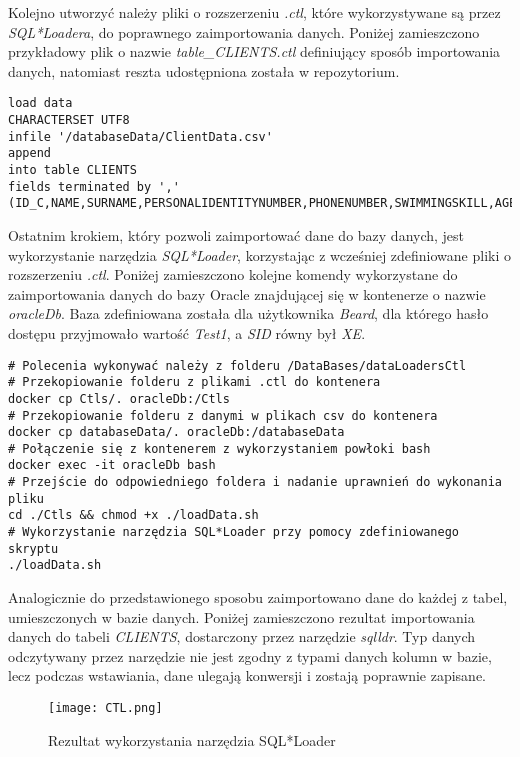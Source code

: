 \documentclass[a4paper]{article}
\begin{document}
Kolejno utworzyć należy pliki o rozszerzeniu \textit{.ctl}, które wykorzystywane są przez \textit{SQL*Loadera}, \linebreak do poprawnego zaimportowania danych. Poniżej zamieszczono przykładowy plik o nazwie \linebreak \textit{table\_CLIENTS.ctl} definiujący sposób importowania danych, natomiast reszta udostępniona została w repozytorium.

\begin{verbatim}
load data 
CHARACTERSET UTF8
infile '/databaseData/ClientData.csv' 
append
into table CLIENTS
fields terminated by ','
(ID_C,NAME,SURNAME,PERSONALIDENTITYNUMBER,PHONENUMBER,SWIMMINGSKILL,AGE)
\end{verbatim}

Ostatnim krokiem, który pozwoli zaimportować dane do bazy danych, jest wykorzystanie narzędzia \textit{SQL*Loader}, korzystając z wcześniej zdefiniowane pliki o rozszerzeniu \textit{.ctl}. Poniżej zamieszczono kolejne komendy wykorzystane do zaimportowania danych do bazy Oracle znajdującej się w kontenerze o nazwie \textit{oracleDb}. Baza zdefiniowana została dla użytkownika \textit{Beard}, dla którego hasło dostępu przyjmowało wartość \textit{Test1}, a \textit{SID} równy był \textit{XE}.

\begin{verbatim}
# Polecenia wykonywać należy z folderu /DataBases/dataLoadersCtl
# Przekopiowanie folderu z plikami .ctl do kontenera
docker cp Ctls/. oracleDb:/Ctls
# Przekopiowanie folderu z danymi w plikach csv do kontenera
docker cp databaseData/. oracleDb:/databaseData
# Połączenie się z kontenerem z wykorzystaniem powłoki bash
docker exec -it oracleDb bash
# Przejście do odpowiedniego foldera i nadanie uprawnień do wykonania pliku
cd ./Ctls && chmod +x ./loadData.sh
# Wykorzystanie narzędzia SQL*Loader przy pomocy zdefiniowanego skryptu
./loadData.sh
\end{verbatim}

Analogicznie do przedstawionego sposobu zaimportowano dane do każdej z tabel, umieszczonych w bazie danych.
Poniżej zamieszczono rezultat importowania danych do tabeli \textit{CLIENTS}, dostarczony przez narzędzie \textit{sqlldr}. Typ danych odczytywany przez narzędzie nie jest zgodny z typami danych kolumn w bazie, lecz podczas wstawiania, dane ulegają konwersji i zostają poprawnie zapisane.

\newpage

\begin{figure}[h!]
\centering
\texttt{[image: CTL.png]}
\caption{Rezultat wykorzystania narzędzia SQL*Loader}
\end{figure}
\end{document}
